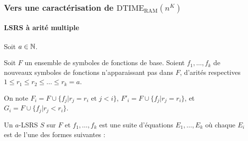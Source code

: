 \documentclass[10pt]{beamer}
\newcommand{\dtimeram}{\text{DTIME}_{\text{RAM}}\left( n^K \right)}
\begin{document}
	
	\begin{frame}
		\frametitle{Vers une caractérisation de $\dtimeram$}
		\framesubtitle{LSRS à arité multiple}
		
		Soit $a \in \mathbb{N}$.
		
		\begin{defn}[$a$-LSRS]
			Soit $F$ un ensemble de symboles de fonctions de base. Soient $f_1, \dots, f_k$ de nouveaux symboles de fonctions n'apparaissant pas dans $F$, d'arités respectives $1 \leqslant r_1 \leqslant r_2 \leqslant \dots \leqslant r_k = a$.
			
			On note $F_i = F \cup \{f_j | r_j = r_i \text{ et } j < i\}$, $F'_i = F \cup \{f_j | r_j = r_i\}$, et $G_i = F \cup \{ f_j | r_j < r_i\}$. %
			
			
			Un $a$-LSRS $S$ sur $F$ et $f_1, \dots, f_k$ est une suite d'équations $E_1, \dots, E_k$ où chaque $E_i$ est de l'une des formes suivantes :
			
			

\end{defn}
\end{frame}
\end{document}

